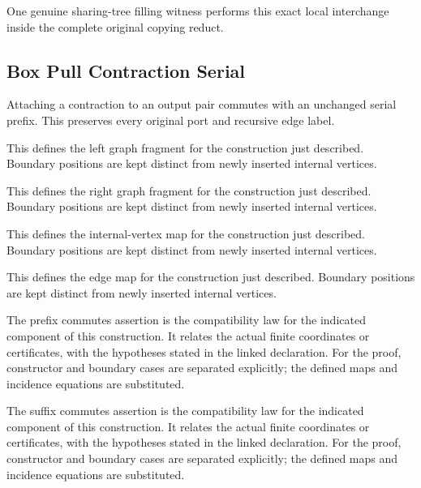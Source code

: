 One genuine sharing-tree filling witness performs this exact local interchange inside the complete original copying reduct.
\par{}

\subsection{Box Pull Contraction Serial}
Attaching a contraction to an output pair commutes with an unchanged serial prefix. This preserves every original port and recursive edge label.

This defines the left graph fragment for the construction just described. Boundary positions are kept distinct from newly inserted internal vertices.
\par{}

This defines the right graph fragment for the construction just described. Boundary positions are kept distinct from newly inserted internal vertices.
\par{}

This defines the internal-vertex map for the construction just described. Boundary positions are kept distinct from newly inserted internal vertices.
\par{}

This defines the edge map for the construction just described. Boundary positions are kept distinct from newly inserted internal vertices.
\par{}

The prefix commutes assertion is the compatibility law for the indicated component of this construction. It relates the actual finite coordinates or certificates, with the hypotheses stated in the linked declaration.
For the proof, constructor and boundary cases are separated explicitly; the defined maps and incidence equations are substituted.
\par{}

The suffix commutes assertion is the compatibility law for the indicated component of this construction. It relates the actual finite coordinates or certificates, with the hypotheses stated in the linked declaration.
For the proof, constructor and boundary cases are separated explicitly; the defined maps and incidence equations are substituted.
\par{}

